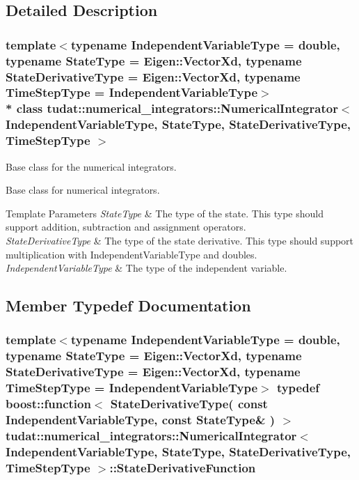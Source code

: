 \subsection{Detailed Description}
\subsubsection*{template$<$typename Independent\+Variable\+Type = double, typename State\+Type = Eigen\+::\+Vector\+Xd, typename State\+Derivative\+Type = Eigen\+::\+Vector\+Xd, typename Time\+Step\+Type = Independent\+Variable\+Type$>$\\*
class tudat\+::numerical\+\_\+integrators\+::\+Numerical\+Integrator$<$ Independent\+Variable\+Type, State\+Type, State\+Derivative\+Type, Time\+Step\+Type $>$}

Base class for the numerical integrators. 

Base class for numerical integrators. 
\begin{DoxyTemplParams}{Template Parameters}
{\em State\+Type} & The type of the state. This type should support addition, subtraction and assignment operators. \\
\hline
{\em State\+Derivative\+Type} & The type of the state derivative. This type should support multiplication with Independent\+Variable\+Type and doubles. \\
\hline
{\em Independent\+Variable\+Type} & The type of the independent variable. \\
\hline
\end{DoxyTemplParams}


\subsection{Member Typedef Documentation}
\subsubsection[{\texorpdfstring{State\+Derivative\+Function}{StateDerivativeFunction}}]{\setlength{\rightskip}{0pt plus 5cm}template$<$typename Independent\+Variable\+Type = double, typename State\+Type = Eigen\+::\+Vector\+Xd, typename State\+Derivative\+Type = Eigen\+::\+Vector\+Xd, typename Time\+Step\+Type = Independent\+Variable\+Type$>$ typedef boost\+::function$<$ State\+Derivative\+Type( const Independent\+Variable\+Type, const State\+Type\& ) $>$ {\bf tudat\+::numerical\+\_\+integrators\+::\+Numerical\+Integrator}$<$ Independent\+Variable\+Type, State\+Type, State\+Derivative\+Type, Time\+Step\+Type $>$\+::{\bf State\+Derivative\+Function}}\hypertarget{classtudat_1_1numerical__integrators_1_1NumericalIntegrator_a0d0a5d48ebaf1f5ad9cd7a73b44be0fc}{}\label{classtudat_1_1numerical__integrators_1_1NumericalIntegrator_a0d0a5d48ebaf1f5ad9cd7a73b44be0fc}


